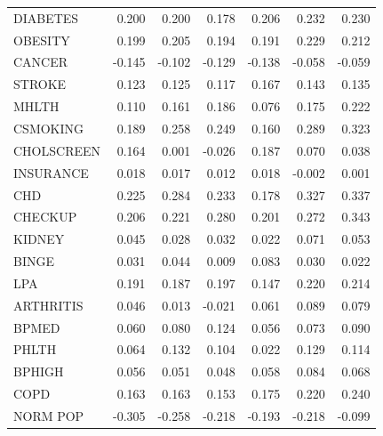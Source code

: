 \documentclass[12pt]{article}
\theoremstyle{definition}
\renewcommand{\_}{%
    \textunderscore\hspace{0pt}%
}
\begin{document}
\begin{table}[!h]
{\begin{tabular}{lrrrrrr}
DIABETES                & 0.200       & 0.200     & 0.178         & 0.206       & 0.232       & 0.230     \\
OBESITY                 & 0.199       & 0.205       & 0.194       & 0.191       & 0.229       & 0.212     \\
CANCER                  & -0.145      & -0.102      & -0.129      & -0.138      & -0.058      & -0.059    \\
STROKE                  & 0.123       & 0.125       & 0.117       & 0.167       & 0.143       & 0.135     \\
MHLTH                   & 0.110       & 0.161       & 0.186       & 0.076       & 0.175       & 0.222     \\
CSMOKING                & 0.189       & 0.258       & 0.249       & 0.160        & 0.289       & 0.323     \\
CHOLSCREEN              & 0.164       & 0.001       & -0.026      & 0.187       & 0.070       & 0.038     \\
INSURANCE               & 0.018       & 0.017       & 0.012       & 0.018       & -0.002      & 0.001     \\
CHD                     & 0.225       & 0.284       & 0.233       & 0.178       & 0.327       & 0.337     \\
CHECKUP                 & 0.206       & 0.221       & 0.280       & 0.201       & 0.272       & 0.343     \\
KIDNEY                  & 0.045       & 0.028       & 0.032       & 0.022       & 0.071       & 0.053     \\
BINGE                   & 0.031       & 0.044       & 0.009       & 0.083       & 0.030       & 0.022     \\
LPA                     & 0.191       & 0.187       & 0.197       & 0.147       & 0.220       & 0.214     \\
ARTHRITIS               & 0.046       & 0.013       & -0.021      & 0.061       & 0.089       & 0.079     \\
BPMED                   & 0.060       & 0.080        & 0.124       & 0.056       & 0.073      & 0.090      \\
PHLTH                   & 0.064       & 0.132       & 0.104       & 0.022       & 0.129       & 0.114     \\
BPHIGH                  & 0.056       & 0.051       & 0.048       & 0.058       & 0.084       & 0.068     \\
COPD                    & 0.163       & 0.163       & 0.153       & 0.175       & 0.220       & 0.240     \\
NORM\_POP               & -0.305      & -0.258      & -0.218      & -0.193      & -0.218      & -0.099  \\
\bottomrule
\end{tabular}
}
\end{table}
\end{document}
